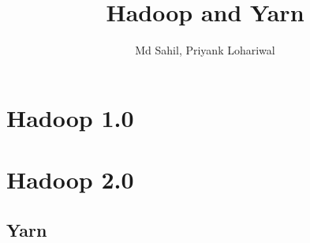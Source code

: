 \documentclass{article}
\begin{document}
    
\title{Hadoop and Yarn}
\author{Md Sahil, Priyank Lohariwal}
{\maketitle}
{\titlepage}
\section{Hadoop 1.0}
\section{Hadoop 2.0}
\subsection{Yarn}
\end{document}
